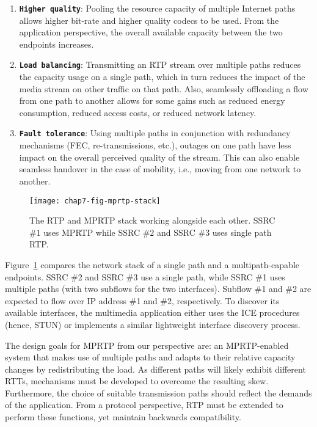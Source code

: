 \begin{enumerate}
\setlength{\itemsep}{5pt}

\item \textbf{\texttt{Higher quality}}: Pooling the resource capacity of
multiple Internet paths allows higher bit-rate and higher quality codecs to be
used. From the application perspective, the overall available capacity between the
two endpoints increases.

\item \textbf{\texttt{Load balancing}}: Transmitting an RTP stream over
multiple paths reduces the capacity usage on a single path, which in turn
reduces the impact of the media stream on other traffic on that path. Also,
seamlessly offloading a flow from one path to another allows for some gains
such as reduced energy consumption, reduced access costs, or reduced
network latency.

\item \textbf{\texttt{Fault tolerance}}: Using multiple paths in conjunction
with redundancy mechanisms (FEC, re-transmissions, etc.), outages on one path
have less impact on the overall perceived quality of the stream. This can also
enable seamless handover in the case of mobility, i.e., moving from one
network to another.

\end{enumerate}


\begin{figure}
\centerline {
\texttt{[image: chap7-fig-mprtp-stack]}
}
\caption{The RTP and MPRTP stack working alongside each other. SSRC $\#1$ uses
MPRTP while SSRC $\#2$ and SSRC $\#3$ uses single path RTP.}
\label{chap7:fig_mprtp_arch}
\end{figure}

Figure~\ref{chap7:fig_mprtp_arch} compares the network stack of a single path
and a multipath-capable endpoints. SSRC \#2 and SSRC \#3 use a single path,
while SSRC \#1 uses multiple paths (with two subflows for the two interfaces).
Subflow \#1 and \#2 are expected to flow over IP address \#1 and \#2,
respectively. To discover its available interfaces, the multimedia application
either uses the ICE procedures (hence, STUN) or implements a similar
lightweight interface discovery process.

The design goals for MPRTP from our perspective are: an MPRTP-enabled system that 
makes use of multiple paths and adapts to their relative capacity
changes by redistributing the load. As different paths will likely exhibit
different RTTs, mechanisms must be developed to overcome the resulting skew.
Furthermore, the choice of suitable transmission paths should reflect the
demands of the application. From a protocol perspective, RTP must be extended
to perform these functions, yet maintain backwards compatibility.


